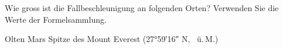 Wie gross ist die Fallbeschleunigung an folgenden Orten? Verwenden Sie die Werte der Formelsammlung.

\begin{abcliste}
\abc Olten
\abc Mars
\abc Spitze des Mount Everest (\ang{27;59;16} N, \hevO\ ü.\,M.)
\end{abcliste}
